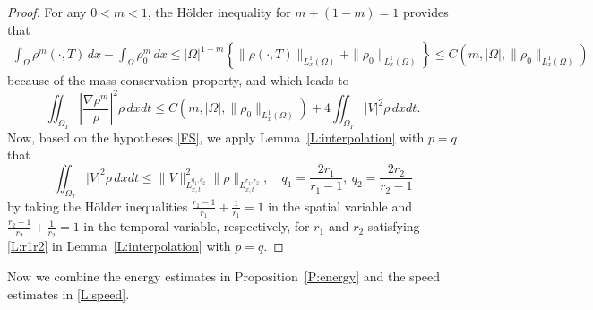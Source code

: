 \documentclass{amsart}
\numberwithin{equation}{section}
\newcommand{\abs}[1]{\left| #1 \right|}
\begin{document}
\begin{proof}
For any $0<m<1$, the H\"{o}lder inequality for $m+(1-m)=1$ provides that 
\[\begin{aligned}
\int_{\Omega} \rho^m (\cdot, T) \,dx - \int_{\Omega} \rho_{0}^{m} \,dx 
  \leq |\Omega|^{1-m}\left\{ \|\rho(\cdot, T)\|_{L^{1}_{x}(\Omega)} + \|\rho_0\|_{L^{1}_{x}(\Omega)}\right\} \leq C(m, |\Omega|, \|\rho_0\|_{L_{x}^{1}(\Omega)})
\end{aligned}\]
because of the mass conservation property, and which leads to
\[
 \iint_{\Omega_{T}} \left|\frac{\nabla \rho^{m}}{\rho}\right|^2 \rho \, dx dt
 \leq C(m,|\Omega|, \|\rho_0\|_{L^{1}_{x}(\Omega)}) + 
4 \iint_{\Omega_T} \abs{V}^2 \rho  \,dxdt.
\]
Now, based on the hypotheses \eqref{FS}, we apply Lemma~\ref{L:interpolation} with $p=q$ that  
\begin{equation}\label{speed04}
\iint_{\Omega_{T}} |V|^2 \rho \,dxdt \leq \|V\|^{2}_{L_{x,t}^{q_1, q_2}} \|\rho\|_{L_{x,t}^{r_1, r_2}}, \quad q_1 = \frac{2r_1}{r_1 -1}, \ q_2 = \frac{2 r_2}{r_2 - 1}
\end{equation}
by taking the H\"{o}lder inequalities $\frac{r_1 -1}{r_1} + \frac{1}{r_1} = 1$ in the spatial variable and $\frac{r_2 -1}{r_2} + \frac{1}{r_2} = 1$ in the temporal variable, respectively, for $r_1$ and $r_2$ satisfying \eqref{L:r1r2} in Lemma~\ref{L:interpolation} with $p=q$. 
 \end{proof}


Now we combine the energy estimates in Proposition~\ref{P:energy} and the speed estimates in \eqref{L:speed}.
\end{document}
